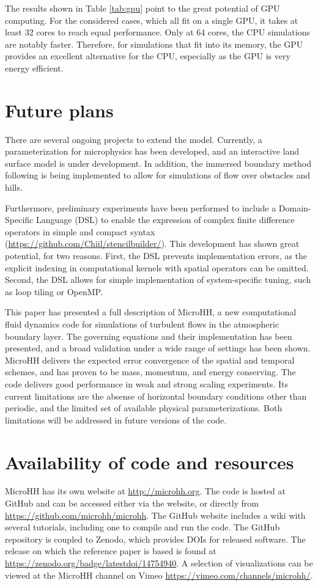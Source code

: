 \documentclass[gmd,manuscript]{copernicus}
\begin{document}
The results shown in Table \ref{tab:gpu} point to the great potential of GPU computing. For the considered cases, which all fit on a single GPU, it takes at least 32 cores to reach equal performance. Only at 64 cores, the CPU simulations are notably faster. Therefore, for simulations that fit into its memory, the GPU provides an excellent alternative for the CPU, especially as the GPU is very energy efficient.

\section{Future plans}\label{sec:future}
There are several ongoing projects to extend the model. Currently, a parameterization for microphysics has been developed, and an interactive land surface model is under development. In addition, the immersed boundary method following \citet{Tseng2003} is being implemented to allow for simulations of flow over obstacles and hills.

Furthermore, preliminary experiments have been performed to include a Domain-Specific Language (DSL) to enable the expression of complex finite difference operators in simple and compact syntax (\url{https://github.com/Chiil/stencilbuilder/}). This development has shown great potential, for two reasons. First, the DSL prevents implementation errors, as the explicit indexing in computational kernels with spatial operators can be omitted. Second, the DSL allows for simple implementation of system-specific tuning, such as loop tiling or OpenMP.

\conclusions  \label{sec:conclusion} %
This paper has presented a full description of MicroHH, a new computational fluid dynamics code for simulations of turbulent flows in the atmospheric boundary layer. The governing equations and their implementation has been presented, and a broad validation under a wide range of settings has been shown. MicroHH delivers the expected error convergence of the spatial and temporal schemes, and has proven to be mass, momentum, and energy conserving. The code delivers good performance in weak and strong scaling experiments. Its current limitations are the absense of horizontal boundary conditions other than periodic, and the limited set of available physical parameterizations. Both limitations will be addressed in future versions of the code.

\section{Availability of code and resources}\label{sec:howto}
MicroHH has its own website at \url{http://microhh.org}. The code is hosted at GitHub and can be accessed either via the website, or directly from 
\url{https://github.com/microhh/microhh}. The GitHub website includes a wiki with several tutorials, including one to compile and run the code. The GitHub repository is coupled to Zenodo, which provides DOIs for released software. The release on which the reference paper is based is found at \url{https://zenodo.org/badge/latestdoi/14754940}. A selection of visualizations can be viewed at the MicroHH channel on Vimeo \url{https://vimeo.com/channels/microhh/}.
\end{document}
